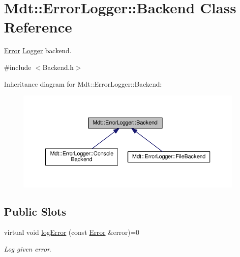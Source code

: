 \hypertarget{class_mdt_1_1_error_logger_1_1_backend}{}\section{Mdt\+:\+:Error\+Logger\+:\+:Backend Class Reference}
\label{class_mdt_1_1_error_logger_1_1_backend}


\hyperlink{class_mdt_1_1_error}{Error} \hyperlink{class_mdt_1_1_error_logger_1_1_logger}{Logger} backend.  




{\ttfamily \#include $<$Backend.\+h$>$}



Inheritance diagram for Mdt\+:\+:Error\+Logger\+:\+:Backend\+:\nopagebreak
\begin{figure}[H]
\begin{center}
\leavevmode
\includegraphics[width=350pt]{class_mdt_1_1_error_logger_1_1_backend__inherit__graph}
\end{center}
\end{figure}
\subsection*{Public Slots}
\begin{DoxyCompactItemize}
\item 
virtual void \hyperlink{class_mdt_1_1_error_logger_1_1_backend_acf37cfc576269934ca8ce04e3601058d}{log\+Error} (const \hyperlink{class_mdt_1_1_error}{Error} \&error)=0
\begin{DoxyCompactList}\small\item\em Log given error. \end{DoxyCompactList}\end{DoxyCompactItemize}
